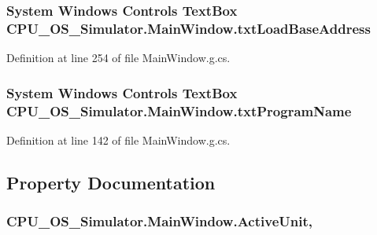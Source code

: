 \subsubsection[{txt\+Load\+Base\+Address}]{\setlength{\rightskip}{0pt plus 5cm}System Windows Controls Text\+Box C\+P\+U\+\_\+\+O\+S\+\_\+\+Simulator.\+Main\+Window.\+txt\+Load\+Base\+Address\hspace{0.3cm}{\ttfamily [package]}}\label{class_c_p_u___o_s___simulator_1_1_main_window_ae6c0ce6078d081b2cb99518c68f1cd85}


Definition at line 254 of file Main\+Window.\+g.\+cs.

\hypertarget{class_c_p_u___o_s___simulator_1_1_main_window_a2c64b45db8c1d7a30c2f9155899cf918}{}
\subsubsection[{txt\+Program\+Name}]{\setlength{\rightskip}{0pt plus 5cm}System Windows Controls Text\+Box C\+P\+U\+\_\+\+O\+S\+\_\+\+Simulator.\+Main\+Window.\+txt\+Program\+Name\hspace{0.3cm}{\ttfamily [package]}}\label{class_c_p_u___o_s___simulator_1_1_main_window_a2c64b45db8c1d7a30c2f9155899cf918}


Definition at line 142 of file Main\+Window.\+g.\+cs.



\subsection{Property Documentation}
\hypertarget{class_c_p_u___o_s___simulator_1_1_main_window_a3d03550a73d7ab18ebd143a38dbf1431}{}
\subsubsection[{Active\+Unit}]{ C\+P\+U\+\_\+\+O\+S\+\_\+\+Simulator.\+Main\+Window.\+Active\+Unit\hspace{0.3cm}{\ttfamily [get]}, {\ttfamily [set]}}\label{class_c_p_u___o_s___simulator_1_1_main_window_a3d03550a73d7ab18ebd143a38dbf1431}


